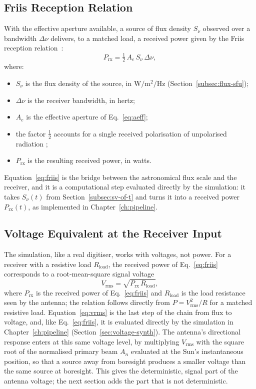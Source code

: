 \subsection{Friis Reception Relation}
\label{subsec:friis}
With the effective aperture available, a source of flux density $S_\nu$
observed over a bandwidth $\Delta\nu$ delivers, to a matched load, a received
power given by the Friis reception relation~\citep{friis1946}:
\begin{equation}
  P_\mathrm{rx} = \tfrac{1}{2}\,A_e\,S_\nu\,\Delta\nu ,
  \label{eq:friis}
\end{equation}
where:
\begin{itemize}[leftmargin=1.5em,itemsep=1pt,topsep=2pt]
  \item $S_\nu$ is the flux density of the source, in
        $\si{\watt\per\square\metre\per\hertz}$ (Section~\ref{subsec:flux-sfu});
  \item $\Delta\nu$ is the receiver bandwidth, in hertz;
  \item $A_e$ is the effective aperture of Eq.~\eqref{eq:aeff};
  \item the factor $\tfrac12$ accounts for a single received polarisation of
        unpolarised radiation \citep{tms2017,kraus1986};
  \item $P_\mathrm{rx}$ is the resulting received power, in watts.
\end{itemize}
Equation~\eqref{eq:friis} is the bridge between the astronomical flux scale
and the receiver, and it is a computational step evaluated directly by the
simulation: it takes $S_\nu(t)$ from Section~\ref{subsec:sv-of-t} and turns it
into a received power $P_\mathrm{rx}(t)$, as implemented in
Chapter~\ref{ch:pipeline}.

\subsection{Voltage Equivalent at the Receiver Input}
\label{subsec:voltage-equiv}
The simulation, like a real digitiser, works with voltages, not power. For a
receiver with a resistive load $R_\mathrm{load}$, the received power of
Eq.~\eqref{eq:friis} corresponds to a root-mean-square signal voltage
\begin{equation}
  V_\mathrm{rms} = \sqrt{P_\mathrm{rx}\,R_\mathrm{load}} ,
  \label{eq:vrms}
\end{equation}
where $P_\mathrm{rx}$ is the received power of Eq.~\eqref{eq:friis} and
$R_\mathrm{load}$ is the load resistance seen by the antenna; the relation
follows directly from $P=V_\mathrm{rms}^2/R$ for a matched resistive load.
Equation~\eqref{eq:vrms} is the last step of the chain from flux to voltage,
and, like Eq.~\eqref{eq:friis}, it is evaluated directly by the simulation in
Chapter~\ref{ch:pipeline} (Section~\ref{sec:voltage-synth}). The antenna's
directional response enters at this same voltage level, by multiplying
$V_\mathrm{rms}$ with the square root of the normalised primary beam $A_n$
evaluated at the Sun's instantaneous position, so that a source away from
boresight produces a smaller voltage than the same source at boresight. This
gives the deterministic, signal part of the antenna voltage; the next section
adds the part that is not deterministic.

